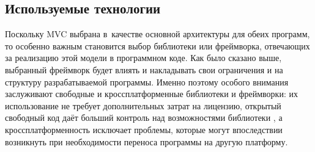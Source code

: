 \documentclass[a4paper, 14pt]{extarticle}
\newcommand{\eng}[1]{{\English #1}}
\begin{document}

  \subsection{Используемые технологии}\label{ssec:techno}



  Поскольку MVC выбрана в~качестве основной архитектуры для обеих программ, то особенно важным
  становится выбор библиотеки или фреймворка, отвечающих за реализацию этой модели в программном
  коде. Как было сказано выше, выбранный фреймворк будет влиять и накладывать свои ограничения и на
  структуру разрабатываемой программы. Именно поэтому особого внимания заслуживают свободные и
  кроссплатформенные библиотеки и фреймворки: их использование не требует дополнительных затрат на
  лицензию, открытый свободный код даёт больший контроль над возможностями библиотеки \cite{open-source},
  а кроссплатформенность исключает проблемы, которые могут впоследствии возникнуть при необходимости
  переноса программы на другую платформу.
\end{document}
